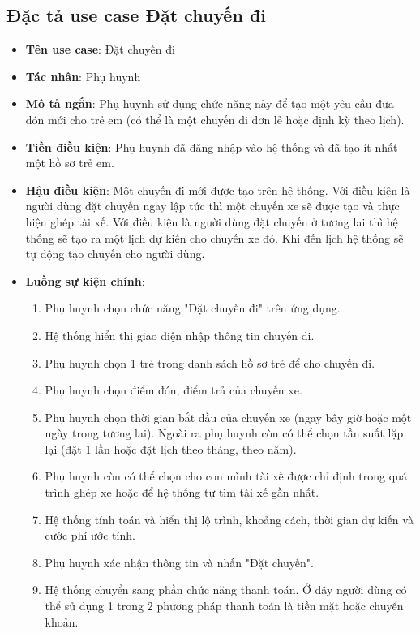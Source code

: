 \documentclass[../DoAn.tex]{subfiles}
\begin{document}
\subsection{Đặc tả use case Đặt chuyến đi}
\begin{itemize}
    \item \textbf{Tên use case}: Đặt chuyến đi
    \item \textbf{Tác nhân}: Phụ huynh
    \item \textbf{Mô tả ngắn}: Phụ huynh sử dụng chức năng này để tạo một yêu cầu đưa đón mới cho trẻ em (có thể là một chuyến đi đơn lẻ hoặc định kỳ theo lịch).
    \item \textbf{Tiền điều kiện}: Phụ huynh đã đăng nhập vào hệ thống và đã tạo ít nhất một hồ sơ trẻ em.
    \item \textbf{Hậu điều kiện}: Một chuyến đi mới được tạo trên hệ thống. Với điều kiện là người dùng đặt chuyến ngay lập tức thì một chuyến xe sẽ được tạo và thực hiện ghép tài xế. Với điều kiện là người dùng đặt chuyến ở tương lai thì hệ thống sẽ tạo ra một lịch dự kiến cho chuyến xe đó. Khi đến lịch hệ thống sẽ tự động tạo chuyến cho người dùng.
    \item \textbf{Luồng sự kiện chính}:
          \begin{enumerate}
              \item Phụ huynh chọn chức năng "Đặt chuyến đi" trên ứng dụng.
              \item Hệ thống hiển thị giao diện nhập thông tin chuyến đi.
              \item Phụ huynh chọn 1 trẻ trong danh sách hồ sơ trẻ để cho chuyến đi.
              \item Phụ huynh chọn điểm đón, điểm trả của chuyến xe.
              \item Phụ huynh chọn thời gian bắt đầu của chuyến xe (ngay bây giờ hoặc một ngày trong tương lai). Ngoài ra phụ huynh còn có thể chọn tần suất lặp lại (đặt 1 lần hoặc đặt lịch theo tháng, theo năm).
              \item Phụ huynh còn có thể chọn cho con mình tài xế được chỉ định trong quá trình ghép xe hoặc để hệ thống tự tìm tài xế gần nhất.
              \item Hệ thống tính toán và hiển thị lộ trình, khoảng cách, thời gian dự kiến và cước phí ước tính.
              \item Phụ huynh xác nhận thông tin và nhấn "Đặt chuyến".
              \item Hệ thống chuyển sang phần chức năng thanh toán. Ở đây người dùng có thể sử dụng 1 trong 2 phương pháp thanh toán là tiền mặt hoặc chuyển khoản.

\end{enumerate}
\end{itemize}
\end{document}
